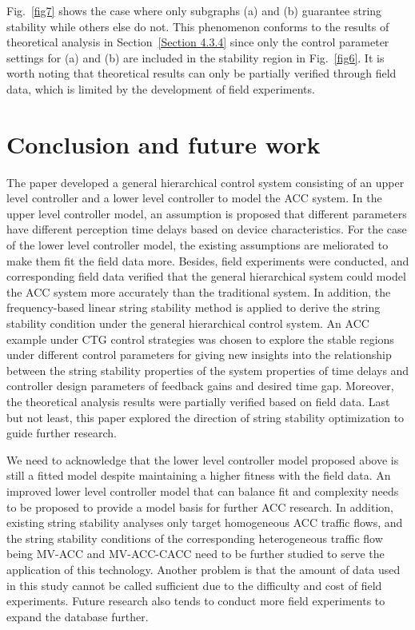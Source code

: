 \documentclass[journal]{IEEEtran}
\begin{document}
Fig.~\ref{fig7} shows the case where only subgraphs (a) and (b) guarantee string stability while others else do not. This phenomenon conforms to the results of theoretical analysis in Section~\ref{Section 4.3.4} since only the control parameter settings for (a) and (b) are included in the stability region in Fig.~\ref{fig6}. It is worth noting that theoretical results can only be partially verified through field data, which is limited by the development of field experiments.


\section{Conclusion and future work}
\label{Section 5}

The paper developed a general hierarchical control system consisting of an upper level controller and a lower level controller to model the ACC system. In the upper level controller model, an assumption is proposed that different parameters have different perception time delays based on device characteristics. For the case of the lower level controller model, the existing assumptions are meliorated to make them fit the field data more. Besides, field experiments were conducted, and corresponding field data verified that the general hierarchical system could model the ACC system more accurately than the traditional system. In addition, the frequency-based linear string stability method is applied to derive the string stability condition under the general hierarchical control system. An ACC example under CTG control strategies was chosen to explore the stable regions under different control parameters for giving new insights into the relationship between the string stability properties of the system properties of time delays and controller design parameters of feedback gains and desired time gap. Moreover, the theoretical analysis results were partially verified based on field data. Last but not least, this paper explored the direction of string stability optimization to guide further research.

We need to acknowledge that the lower level controller model proposed above is still a fitted model despite maintaining a higher fitness with the field data. An improved lower level controller model that can balance fit and complexity needs to be proposed to provide a model basis for further ACC research. In addition, existing string stability analyses only target homogeneous ACC traffic flows, and the string stability conditions of the corresponding heterogeneous traffic flow being MV-ACC and MV-ACC-CACC need to be further studied to serve the application of this technology. Another problem is that the amount of data used in this study cannot be called sufficient due to the difficulty and cost of field experiments. Future research also tends to conduct more field experiments to expand the database further.
\end{document}
